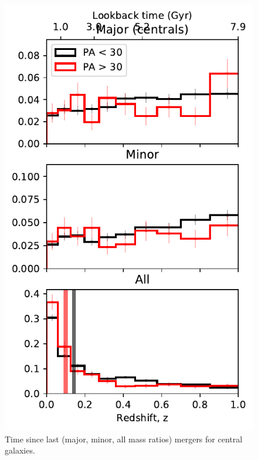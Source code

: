 \documentclass[fleqn,usenatbib]{mnras}
\begin{document}
\begin{figure}
	\includegraphics[width=\linewidth]{tng_results/time_since_last_merger_centrals_PA_split.pdf}
    \caption{Time since last (major, minor, all mass ratios) mergers for central galaxies.}
    \label{fig:last_merger_cen}
\end{figure}
\end{document}

